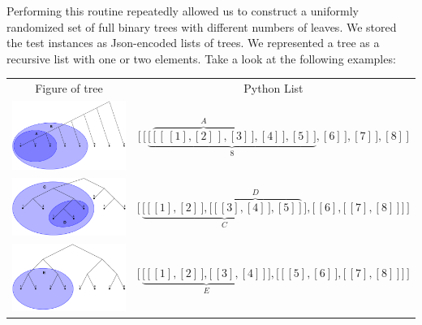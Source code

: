 Performing this routine repeatedly allowed us to construct a uniformly randomized set of full binary trees with different numbers of leaves. We stored the test instances as Json-encoded lists of trees. We represented a tree as a recursive list with one or two elements. Take a look at the following examples:

\begin{table}[h!]
	\centering
	\begin{tabular}{c | c} 
 		Figure of tree & Python List \\
		\cmidrule(r){1-1}\cmidrule(l){2-2}
		{\includegraphics[width=.4\textwidth, margin=0pt 0pt 0pt 1ex,valign=m]{figures/python_tree_example_1.png}}
		& $\Bigg[ \, \bigg[ \, \underbrace{\Big[ \, \overbrace{\big[ \, [ \, [ 1 ], [ 2 ] \, ], [ 3 ] \, \big]}^{A}, [ 4 ] \, ], [ 5 ] \, \Big]}_{8}, [ 6 ] \, ], [ 7 ] \, \bigg], [ 8 ] \, \Bigg] $\\
		\cmidrule(r){1-1}\cmidrule(l){2-2} 
		{\includegraphics[width=.4\textwidth, margin=0pt 0pt 0pt 1ex,valign=m]{figures/python_tree_example_2.png}}
		& $\Bigg[ \, \underbrace{\bigg[ \, \Big[ \, [ 1 ], [ 2 ] \, \Big], \overbrace{\Big[ \, \big[ \, [ 3 ], [ 4 ] \, \big], [ 5 ] \, \Big]}^{D} \, \bigg]}_{C}, \bigg[ \, [ 6 ], \Big[ \, [ 7 ], [ 8 ] \, \Big]  \, \bigg] \, \Bigg]$\\
		\cmidrule(r){1-1}\cmidrule(l){2-2} 
		{\includegraphics[width=.4\textwidth, margin=0pt 0pt 0pt 1ex,valign=m]{figures/python_tree_example_3.png}}
		& $\Bigg[ \, \underbrace{\bigg[ \, \Big[ \, [ 1 ], [ 2 ] \, \Big], \Big[ \, [ 3 ], [ 4 ] \, \Big] \, \bigg]}_{E}, \bigg[ \, \Big[ \, [ 5 ], [ 6 ] \, \Big], \Big[ \, [ 7 ], [ 8 ] \, \Big] \, \bigg] \, \Bigg]$\\
		
	\end{tabular}
\end{table}

